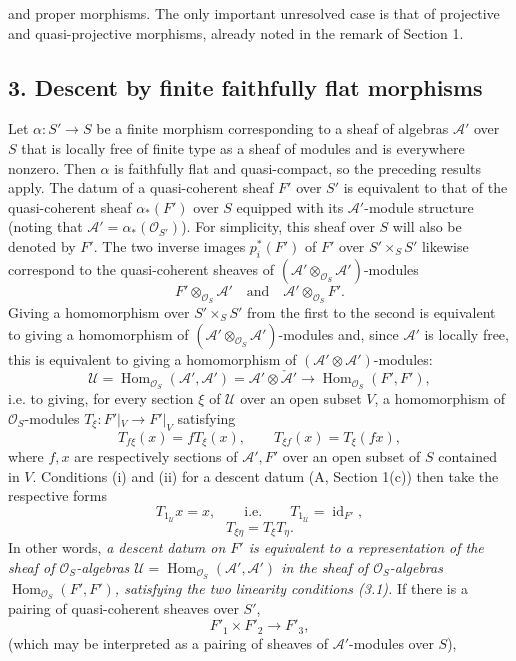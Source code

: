 and proper morphisms. The only important unresolved case is that of projective
and quasi-projective morphisms, already noted in the remark of Section 1.

\subsection*{3. Descent by finite faithfully flat morphisms}

Let $\alpha:S'\longrightarrow S$ be a finite morphism corresponding to a sheaf
of algebras $\mathcal A'$ over $S$ that is locally free of finite type as a
sheaf of modules and is everywhere nonzero. Then $\alpha$ is faithfully flat
and quasi-compact, so the preceding results apply. The datum of a
quasi-coherent sheaf $F'$ over $S'$ is equivalent to that of the quasi-coherent
sheaf $\alpha_*(F')$ over $S$ equipped with its $\mathcal A'$-module structure
(noting that $\mathcal A'=\alpha_*(\mathcal O_{S'})$). For simplicity, this
sheaf over $S$ will also be denoted by $F'$. The two inverse images $p_i^*(F')$
of $F'$ over $S'\times_SS'$ likewise correspond to the quasi-coherent sheaves
of $(\mathcal A'\otimes_{\mathcal O_S}\mathcal A')$-modules
\[
  F'\otimes_{\mathcal O_S}\mathcal A'
  \quad\text{and}\quad
  \mathcal A'\otimes_{\mathcal O_S}F'.
\]
Giving a homomorphism over $S'\times_SS'$ from the first to the second is
equivalent to giving a homomorphism of
$(\mathcal A'\otimes_{\mathcal O_S}\mathcal A')$-modules and, since
$\mathcal A'$ is locally free, this is equivalent to giving a homomorphism of
$(\mathcal A'\otimes\mathcal A')$-modules:
\[
  \mathcal U=
  \operatorname{Hom}_{\mathcal O_S}(\mathcal A',\mathcal A')
  =\mathcal A'\otimes\check{\mathcal A}'
  \longrightarrow
  \operatorname{Hom}_{\mathcal O_S}(F',F'),
\]
i.e. to giving, for every section $\xi$ of $\mathcal U$ over an open subset
$V$, a homomorphism of $\mathcal O_S$-modules
$T_\xi:F'|_V\longrightarrow F'|_V$ satisfying
\begin{equation}
  T_{f\xi}(x)=fT_\xi(x),
  \qquad T_{\xi f}(x)=T_\xi(fx),
  \tag{3.1}
\end{equation}
where $f,x$ are respectively sections of $\mathcal A',F'$ over an open subset
of $S$ contained in $V$. Conditions (i) and (ii) for a descent datum
(A, Section 1(c)) then take the respective forms
\begin{equation}
  T_{1_{\mathcal U}}x=x,
  \qquad\text{i.e.}\qquad
  T_{1_{\mathcal U}}=\operatorname{id}_{F'},
  \tag{3.2}
\end{equation}
\begin{equation}
  T_{\xi\eta}=T_\xi T_\eta.
  \tag{3.3}
\end{equation}
In other words, \emph{a descent datum on $F'$ is equivalent to a representation
of the sheaf of $\mathcal O_S$-algebras
$\mathcal U=\operatorname{Hom}_{\mathcal O_S}(\mathcal A',\mathcal A')$ in the
sheaf of $\mathcal O_S$-algebras
$\operatorname{Hom}_{\mathcal O_S}(F',F')$, satisfying the two linearity
conditions (3.1).} If there is a pairing of quasi-coherent sheaves over $S'$,
\[
  F'_1\times F'_2\longrightarrow F'_3,
\]
(which may be interpreted as a pairing of sheaves of $\mathcal A'$-modules
over $S$),

